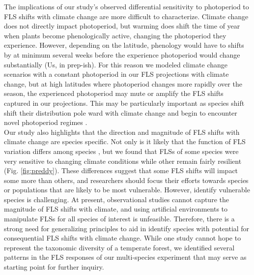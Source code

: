 \documentclass[11pt]{article}
\begin{document}
\noindent The implications of our study's observed differential sensitivity to photoperiod to FLS shifts with climate change are more difficult to characterize.  Climate change does not directly impact photoperiod, but warming does shift the time of year when plants become phenologically active, changing the photoperiod they experience.  However, depending on the latitude, phenology would have to shifts by at minimum several weeks before the experience photoperiod would change substantially \citep{}(Us, in prep-ish). For this reason we modeled climate change scenarios with a constant photoperiod in our FLS projections with climate change, but at high latitudes where photoperiod changes more rapidly over the season, the experienced photoperiod may mute or amplify the FLS shifts captured in our projections. This may be particularly important as species shift shift their distribution pole ward with climate change and begin to encounter novel photoperiod regimes \citep{WAY:2015aa}.\\

\noindent  Our study also highlights that the direction and magnitude of FLS shifts with climate change are species specific. Not only is it likely that the function of FLS variation differs among species \citep{Buonaiuto2020}, but we found that FLSs of some species were very sensitive to changing climate conditions while other remain fairly resilient (Fig. \ref{fig:preddy}). These differences suggest that some FLS shifts will impact some more than others, and researchers should focus their efforts towards species or populations that are likely to be most vulnerable. However, identify vulnerable species is challenging. At present, observational studies cannot capture the magnitude of FLS shifts with climate, and using artificial environments to manipulate FLSs for all species of interest is unfeasible. Therefore, there is a strong need for generalizing principles to aid in identify species with potential for consequential FLS shifts with climate change. While one study cannot hope to represent the taxonomic diversity of a temperate forest, we identified several patterns in the FLS responses of our multi-species experiment that may serve as starting point for further inquiry.
\end{document}
